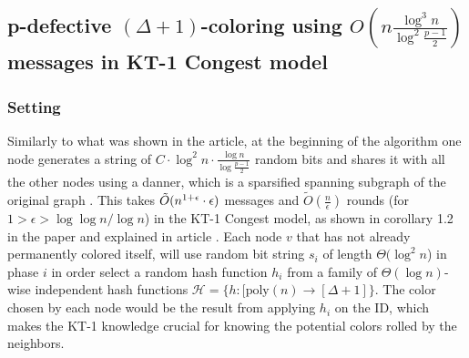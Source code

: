 \documentclass[11pt]{article}
\begin{document}
\subsection{\texorpdfstring{p-defective $(\Delta+1)$-coloring using $O(n \frac{\log^3{n}}{\log^2{\frac{p-1}{2}}})$ messages in KT-1 Congest model}{}}

\subsubsection*{Setting}

Similarly to what was shown in the article, at the beginning of the algorithm one node generates a string of  $C \cdot \log^2{n} \cdot \frac{\log{n}}{\log{\frac{p-1}{2}}}$ random bits and shares it with all the other nodes using a danner, which is a sparsified spanning subgraph of the original graph \cite{Gmyr}. This takes $\Tilde{O}(n^{1+\epsilon}\cdot \epsilon)$ messages and $\tilde{O}(\frac{n}{\epsilon})$ rounds (for $ 1 > \epsilon > \log{\log{n} / \log{n}} $) in the KT-1 Congest model, as shown in corollary 1.2 in the paper and explained in article \cite{Gmyr}. Each node $v$ that has not already permanently colored itself, will use random bit string $s_i$ of length $\Theta(\log^2{n}$) in phase $i$ in order select a random hash function $h_i$ from a family of $\Theta(\log{n})$-wise independent hash functions $\mathcal{H}=\{h:[\text{poly}(n) \xrightarrow{} [\Delta+1] \}$. The color chosen by each node would be the result from applying $h_i$ on the ID, which makes the KT-1 knowledge crucial for knowing the potential colors rolled by the neighbors.
\end{document}
